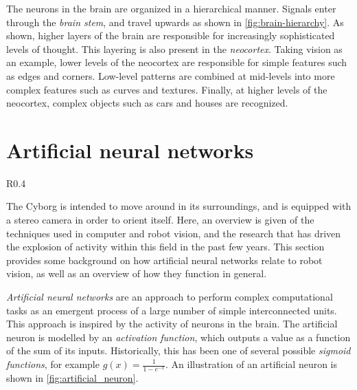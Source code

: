 \documentclass[\rootfolder/main.tex]{subfiles}
\begin{document}
The neurons in the brain are organized in a hierarchical manner.
Signals enter through the \emph{brain stem}, and travel upwards as shown in \cref{fig:brain-hierarchy}.
As shown, higher layers of the brain are responsible for increasingly sophisticated levels of thought.
This layering is also present in the \emph{neocortex}.
Taking vision as an example, lower levels of the neocortex are responsible for simple features such as edges and corners.
Low-level patterns are combined at mid-levels into more complex features such as curves and textures.
Finally, at higher levels of the neocortex, complex objects such as cars and houses are recognized.


\section{Artificial neural networks}

\begin{wrapfigure}{R}{0.4\columnwidth}
    \caption{Model of an artificial neuron.}
    \label{fig:artificial_neuron}
\end{wrapfigure}

The Cyborg is intended to move around in its surroundings, and is equipped with a stereo camera in order to orient itself.
Here, an overview is given of the techniques used in computer and robot vision, and the research that has driven the explosion of activity within this field in the past few years.
This section provides some background on how artificial neural networks relate to robot vision, as well as an overview of how they function in general.

\emph{Artificial neural networks} are an approach to perform complex computational tasks as an emergent process of a large number of simple interconnected units.
This approach is inspired by the activity of neurons in the brain.
The artificial neuron is modelled by an \emph{activation function}, which outputs a value as a function of the sum of its inputs.
Historically, this has been one of several possible \emph{sigmoid functions}, for example $g\left(x\right) = \frac{1}{1 - e^{-x}}$.
An illustration of an artificial neuron is shown in \cref{fig:artificial_neuron}.
\end{document}
